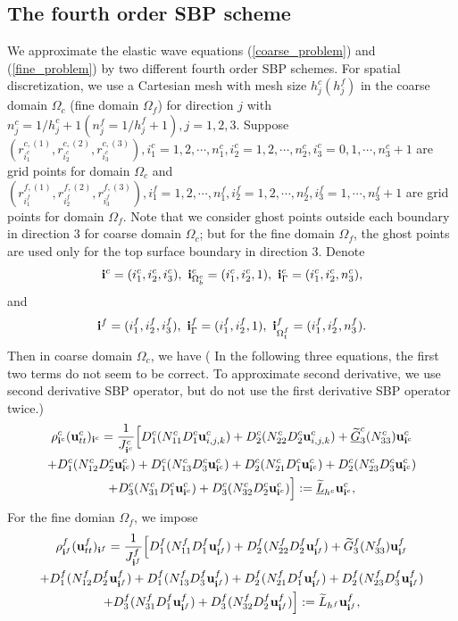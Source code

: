 \documentclass[a4paper]{article}
\newcommand{\wt}{\widetilde}
\begin{document}
\subsection{The fourth order SBP scheme}\label{sub_section_4_1}
We approximate the elastic wave equations (\ref{coarse_problem}) and (\ref{fine_problem}) by two different fourth order SBP schemes. For spatial discretization, we use a Cartesian mesh with mesh size $h_j^c (h_j^f)$ in the coarse domain $\Omega_c$ (fine domain $\Omega_f$) for direction $j$ with $n_j^c = 1/h_j^c +1 (n_j^f = 1/h_j^f +1), j = 1,2,3$. Suppose $(r^{c,(1)}_{i_1^c}, r^{c,(2)}_{i_2^c}, r^{c,(3)}_{i_3^c}), i_1^c = 1,2,\cdots,n_1^c, i_2^c = 1,2,\cdots,n_2^c,i_3^c=0,1,\cdots,n_3^c+1$ are grid points for domain $\Omega_c$ and   $(r^{f,(1)}_{i_1^f}, r^{f,(2)}_{i_2^f}, r^{f,(3)}_{i_3^f}), i_1^f = 1,2,\cdots,n_1^f, i_2^f = 1,2,\cdots,n_2^f,i_3^f=1,\cdots,n_3^f+1$ are grid points for domain $\Omega_f$. Note that we consider ghost points outside each boundary in direction $3$ for coarse domain $\Omega_c$; but for the fine domain $\Omega_f$, the ghost points are used only for the top surface boundary in direction $3$. Denote 
\[{\bf i}^c = (i_1^c,i_2^c,i_3^c), \ {\bf i}^c_{\Omega^c_b} = (i_1^c,i_2^c,1),\  {\bf i}^c_{\Gamma} = (i_1^c,i_2^c,n_3^c),\]
and
\[ {\bf i}^f = (i_1^f,i_2^f,i_3^f), \ {\bf i}^f_{\Gamma} = (i_1^f,i_2^f,1), \ {\bf i}^f_{\Omega_t^f} = (i_1^f,i_2^f,n_3^f).\]
 Then in coarse domain $\Omega_c$, we have {(\color{red} In the following three equations, the first two terms do not seem to be correct. To approximate second derivative, we use second derivative SBP operator, but do not use the first derivative SBP operator twice.)}
\begin{multline}\label{coarse_scheme}
\rho_{{\bf i}^c}^c ({\bf u}_{tt}^c)_{{\bf i}^c} = \frac{1}{J_{{\bf i}^c}^c}\Big[D_1^c(N_{11}^cD_1^c{\bf u}_{i,j,k}^c)+D_2^c(N_{22}^cD_2^c{\bf u}_{i,j,k}^c)+\uline{\wt{G}}_3^c(N_{33}^c){\bf u}_{{\bf i}^c}^c\\
+D_1^c(N_{12}^cD_2^c{\bf u}_{{\bf i}^c}^c)+D_1^c(N_{13}^cD_3^c{\bf u}_{{\bf i}^c}^c)
+D_2^c(N_{21}^cD_1^c{\bf u}_{{\bf i}^c}^c)+D_2^c(N_{23}^cD_3^c{\bf u}_{{\bf i}^c}^c)\\
+D_3^c(N_{31}^cD_1^c{\bf u}_{{\bf i}^c}^c)
+D_3^c(N_{32}^cD_2^c{\bf u}_{{\bf i}^c}^c)\Big] := \uline{\wt{L}}_{h^c} {\bf{u}}^c_{{\bf i}^c},
\end{multline}
 For the fine domian $\Omega_f$, we impose
\begin{multline}\label{fine_scheme_2}
\rho_{{\bf i}^f}^f ({\bf u}_{tt}^f)_{{\bf i}^f} =
 \frac{1}{J_{{\bf i}^f}^f}\Big[D_1^f(N_{11}^fD_1^f{\bf u}_{{\bf i}^f}^f)+D_2^f(N_{22}^fD_2^f{\bf u}_{{\bf i}^f}^f)+\wt{G}_3^f(N_{33}^f){\bf u}_{{\bf i}^f}^f\\
+D_1^f(N_{12}^fD_2^f{\bf u}_{{\bf i}^f}^f)+D_1^f(N_{13}^fD_3^f{\bf u}_{{\bf i}^f}^f)
+D_2^f(N_{21}^fD_1^f{\bf u}_{{\bf i}^f}^f)+D_2^f(N_{23}^fD_3^f{\bf u}_{{\bf i}^f}^f)\\
+D_3^f(N_{31}^fD_1^f{\bf u}_{{\bf i}^f}^f)+D_3^f(N_{32}^fD_2^f{\bf u}_{{\bf i}^f}^f)\Big] 
:= \wt{L}_{h^f}{\bf{u}}^f_{{\bf i}^f},
\end{multline}
\end{document}
